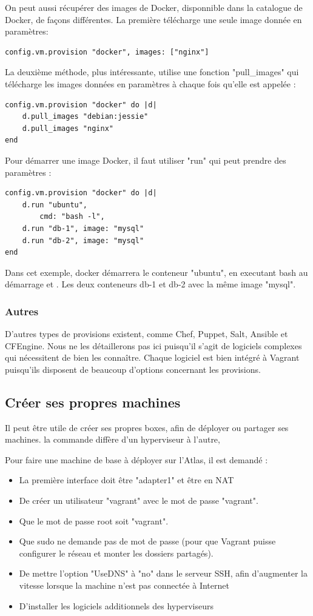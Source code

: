 \documentclass[12pt,a4paper]{article}
\begin{document}
On peut aussi récupérer des images de Docker, disponnible dans la catalogue de Docker, de façons différentes. La première télécharge une seule image donnée en paramètres:
\begin{lstlisting}
config.vm.provision "docker", images: ["nginx"]
\end{lstlisting}
La deuxième méthode, plus intéressante, utilise une fonction "pull\_images" qui télécharge les images données en paramètres à chaque fois qu'elle est appelée : 
\begin{lstlisting}
config.vm.provision "docker" do |d|
	d.pull_images "debian:jessie"
	d.pull_images "nginx"
end
\end{lstlisting}

Pour démarrer une image Docker, il faut utiliser "run" qui peut prendre des paramètres :
\begin{lstlisting}
config.vm.provision "docker" do |d|
	d.run "ubuntu",
		cmd: "bash -l",
	d.run "db-1", image: "mysql"
	d.run "db-2", image: "mysql"
end
\end{lstlisting}
Dans cet exemple, docker démarrera le conteneur "ubuntu", en executant bash au démarrage et . Les deux conteneurs db-1 et db-2 avec la même image "mysql".

\subsubsection{Autres}

D'autres types de provisions existent, comme Chef, Puppet, Salt, Ansible et CFEngine. Nous ne les détaillerons pas ici puisqu'il s'agit de logiciels complexes qui nécessitent de bien les connaître. Chaque logiciel est bien intégré à Vagrant puisqu'ils disposent de beaucoup d'options concernant les provisions.

\subsection{Créer ses propres machines}
Il peut être utile de créer ses propres boxes, afin de déployer ou partager ses machines. la commande diffère d'un hyperviseur à l'autre, 

Pour faire une machine de base à déployer sur l'Atlas, il est demandé :
\begin{itemize}
	\item{La première interface doit être "adapter1" et être en NAT}
	\item{De créer un utilisateur "vagrant" avec le mot de passe "vagrant".}
	\item{Que le mot de passe root soit "vagrant".}
	\item{Que sudo ne demande pas de mot de passe (pour que Vagrant puisse configurer le réseau et monter les dossiers partagés).}
	\item{De mettre l'option "UseDNS" à "no" dans le serveur SSH, afin d'augmenter la vitesse lorsque la machine n'est pas connectée à Internet}
	\item{D'installer les logiciels additionnels des hyperviseurs}
\end{itemize}
\end{document}
